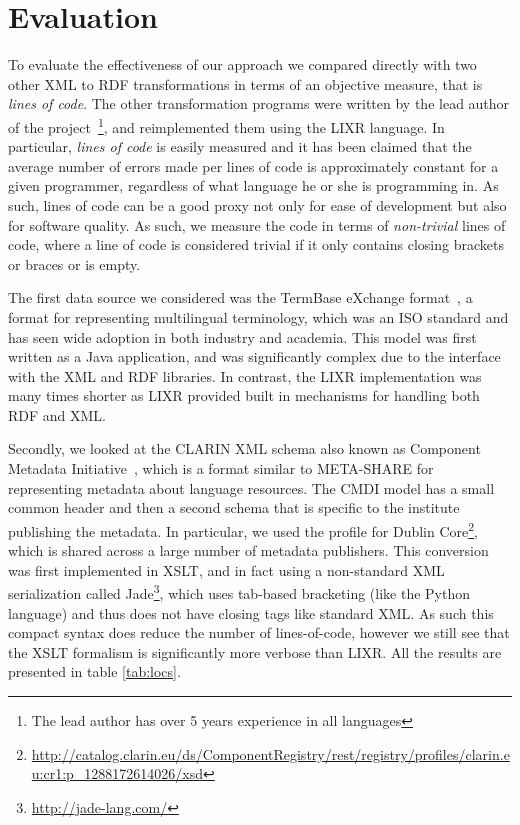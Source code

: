 \documentclass{acm_proc_article-sp}
\begin{document}
\section{Evaluation}
\label{sec:results}


To evaluate the effectiveness of our approach we compared directly with two other
XML to RDF transformations in terms of an objective measure, that is \emph{lines of code}. The other transformation programs were written by the lead author of the
project~\footnote{The lead author has over 5 years experience in all languages}, and
reimplemented them using the LIXR language.
In particular, \emph{lines of code} is easily measured and it
has been claimed that the average number of errors made per lines of code is 
approximately constant for a given programmer, regardless of what language he or
she is programming in. As such, lines of code can be a good proxy not only for
ease of development but also for software quality. As such, we measure the
code in terms of \emph{non-trivial} lines of code, where a line of code
is considered trivial if it only contains closing brackets or braces or is empty. 


The first data source we considered was the
TermBase eXchange format~\cite[TBX]{iso30042}, a format for representing multilingual
terminology, which was an ISO standard and has seen wide adoption in both industry
and academia. This model was first written as a Java application, and was significantly
complex due to the interface with the XML and RDF libraries. In contrast, the LIXR 
implementation was many times shorter as LIXR provided built in mechanisms for 
handling both RDF and XML. 


Secondly, we looked at the CLARIN XML schema also known as
Component Metadata Initiative~\cite{broeder2012cmdi}, which is a format similar
to META-SHARE for representing metadata about language resources. The CMDI model
has a small common header and then a second schema that is specific to the
institute publishing the metadata. In particular, we used the profile for 
Dublin Core\footnote{\url{http://catalog.clarin.eu/ds/ComponentRegistry/rest/registry/profiles/clarin.eu:cr1:p\_1288172614026/xsd}},
which is shared across a large number of metadata publishers. This conversion
was first implemented in XSLT, and in fact using a non-standard XML serialization
called Jade\footnote{\url{http://jade-lang.com/}}, which uses tab-based bracketing 
(like the Python language) and thus does not have closing tags like standard XML.
As such this compact syntax does reduce the number of lines-of-code, however we 
still see that the XSLT formalism is significantly more verbose than LIXR. All
the results are presented in table \ref{tab:locs}. 
\end{document}
